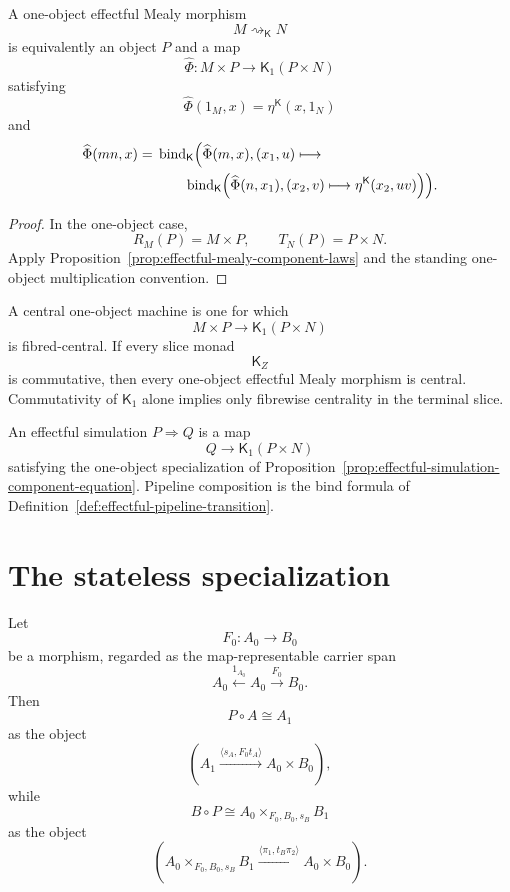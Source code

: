 \begin{proposition}
\label{prop:one-object-effectful-mealy}
A one-object effectful Mealy morphism
\[
    M\rightsquigarrow_{\mathsf K}N
\]
is equivalently an object \(P\) and a map
\[
    \widehat\Phi:
    M\times P
    \to
    \mathsf K_1(P\times N)
\]
satisfying
\[
    \widehat\Phi(1_M,x)
    =
    \eta^{\mathsf K}(x,1_N)
\]
and
\[
\begin{aligned}
    \widehat\Phi(mn,x)
    ={}&
    \operatorname{bind}_{\mathsf K}
    \Bigl(
        \widehat\Phi(m,x),
        (x_1,u)
        \longmapsto
    \\
    &\qquad
        \operatorname{bind}_{\mathsf K}
        \Bigl(
            \widehat\Phi(n,x_1),
            (x_2,v)
            \longmapsto
            \eta^{\mathsf K}
            (x_2,uv)
        \Bigr)
    \Bigr).
\end{aligned}
\]
\end{proposition}

\begin{proof}
In the one-object case,
\[
    R_M(P)=M\times P,
    \qquad
    T_N(P)=P\times N.
\]
Apply Proposition~\ref{prop:effectful-mealy-component-laws} and the standing
one-object multiplication convention.
\end{proof}

A central one-object machine is one for which
\[
    M\times P
    \longrightarrow
    \mathsf K_1(P\times N)
\]
is fibred-central.  If every slice monad
\[
    \mathsf K_Z
\]
is commutative, then every one-object effectful Mealy morphism is central.
Commutativity of \(\mathsf K_1\) alone implies only fibrewise centrality in
the terminal slice.

An effectful simulation \(P\Rightarrow Q\) is a map
\[
    Q\longrightarrow\mathsf K_1(P\times N)
\]
satisfying the one-object specialization of
Proposition~\ref{prop:effectful-simulation-component-equation}.  Pipeline
composition is the bind formula of
Definition~\ref{def:effectful-pipeline-transition}.

\section{The stateless specialization}
\label{sec:stateless-effectful-mealy}

Let
\[
    F_0:A_0\longrightarrow B_0
\]
be a morphism, regarded as the map-representable carrier span
\[
    A_0
    \xleftarrow{1_{A_0}}
    A_0
    \xrightarrow{F_0}
    B_0.
\]
Then
\[
    P\circ A\cong A_1
\]
as the object
\[
    \left(
        A_1
        \xrightarrow{\langle s_A,F_0t_A\rangle}
        A_0\times B_0
    \right),
\]
while
\[
    B\circ P
    \cong
    A_0\times_{F_0,B_0,s_B}B_1
\]
as the object
\[
    \left(
        A_0\times_{F_0,B_0,s_B}B_1
        \xrightarrow{\langle\pi_1,t_B\pi_2\rangle}
        A_0\times B_0
    \right).
\]

